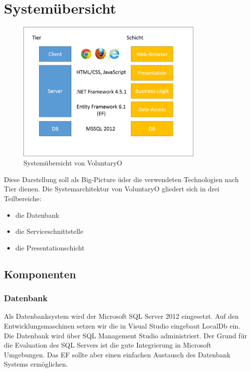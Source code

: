 \chapter{Systemübersicht}
	\begin{figure}
  		\vspace{-25pt}
	  	\begin{center}
    		\includegraphics[height=7cm]{content/architekturdokumentation/images/systemarchitektur.png}
	  	\end{center}
  		\vspace{-20pt}
	 	\caption{Systemübersicht von VoluntaryO}
	\end{figure}
    Diese Darstellung soll als Big-Picture üder die verwendeten Technologien nach Tier dienen.
	Die Systemarchitektur von VoluntaryO gliedert sich in drei Teilbereiche: 
	\\\begin{itemize}
		\item die Datenbank
		\item die Serviceschnittstelle
		\item die Presentationschicht
	\end{itemize}
  	\vspace{3cm}

	\section{Komponenten}
		\subsection{Datenbank}
		Als Datenbanksystem wird der Microsoft SQL Server 2012 eingesetzt. Auf den Entwicklungsmaschinen setzen wir die in Visual Studio eingebaut LocalDb ein. Die Datenbank wird über SQL Management Studio administriert. Der Grund für die Evaluation des SQL Servers ist die gute Integrierung in Microsoft Umgebungen. Das EF sollte aber einen einfachen Austausch des Datenbank Systems ermöglichen.
